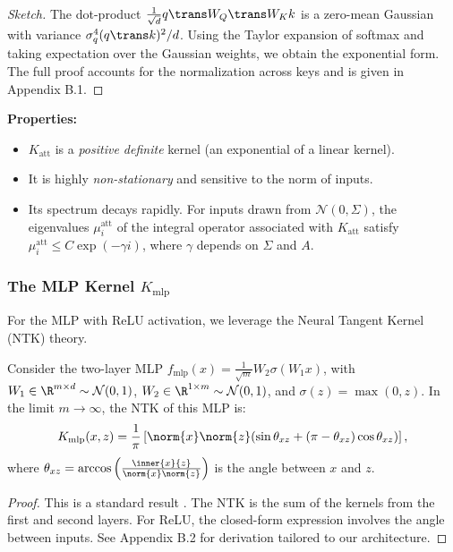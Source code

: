 	\begin{proof}[Sketch]
		The dot-product $\frac{1}{\sqrt{d}} q\trans W_Q\trans W_K k$ is a zero-mean Gaussian with variance $\sigma_q^4 (q\trans k)^2 / d$. Using the Taylor expansion of softmax and taking expectation over the Gaussian weights, we obtain the exponential form. The full proof accounts for the normalization across keys and is given in Appendix B.1.
	\end{proof}
	
	\textbf{Properties:}
	\begin{itemize}
		\item $K_{\text{att}}$ is a \textit{positive definite} kernel (an exponential of a linear kernel).
		\item It is highly \textit{non-stationary} and sensitive to the norm of inputs.
		\item Its spectrum decays rapidly. For inputs drawn from $\mathcal{N}(0, \Sigma)$, the eigenvalues $\mu_i^{\text{att}}$ of the integral operator associated with $K_{\text{att}}$ satisfy $\mu_i^{\text{att}} \leq C \exp(-\gamma i)$, where $\gamma$ depends on $\Sigma$ and $A$.
	\end{itemize}
	
	\subsubsection{The MLP Kernel $K_{\text{mlp}}$}
	\label{subsubsec:mlp_kernel}
	
	For the MLP with ReLU activation, we leverage the Neural Tangent Kernel (NTK) theory.
	
	\begin{lemma}
		\label{lem:mlp_kernel}
		Consider the two-layer MLP $f_{\text{mlp}}(x) = \frac{1}{\sqrt{m}} W_2 \sigma(W_1 x)$, with $W_1 \in \R^{m \times d} \sim \mathcal{N}(0,1)$, $W_2 \in \R^{1 \times m} \sim \mathcal{N}(0,1)$, and $\sigma(z)=\max(0,z)$. In the limit $m \to \infty$, the NTK of this MLP is:
		\[
		K_{\text{mlp}}(x, z) = \frac{1}{\pi} \left[ \norm{x} \norm{z} (\sin \theta_{xz} + (\pi - \theta_{xz}) \cos \theta_{xz}) \right],
		\]
		where $\theta_{xz} = \arccos\left(\frac{\inner{x}{z}}{\norm{x}\norm{z}}\right)$ is the angle between $x$ and $z$.
	\end{lemma}
	
	\begin{proof}
		This is a standard result \citep{arora2019exact}. The NTK is the sum of the kernels from the first and second layers. For ReLU, the closed-form expression involves the angle between inputs. See Appendix B.2 for derivation tailored to our architecture.
	\end{proof}
	
